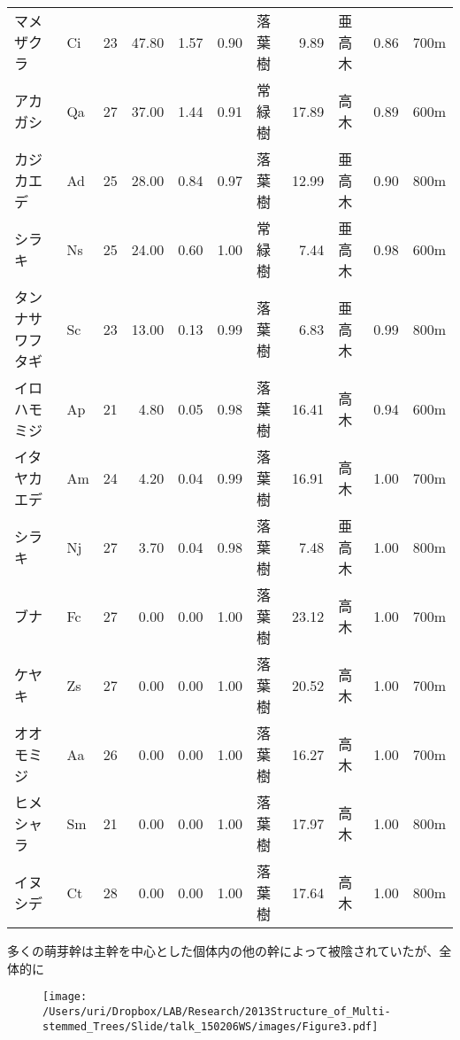 \documentclass[a0, 36pt, plainboxedsections]{sciposter} %
\renewcommand{\baselinestretch}{1.2}
\begin{document}
\begin{multicols}{2}
\begin{table}[ht]
{\begin{tabular}{llrrrrlrlrl}
マメザクラ  &  Ci &  23 & 47.80 & 1.57 & 0.90 & 落葉樹 & 9.89 & 亜高木 & 0.86 & 700m \\ 
アカガシ  &  Qa &  27 & 37.00 & 1.44 & 0.91 & 常緑樹 & 17.89 & 高木 & 0.89 & 600m \\ 
カジカエデ  &  Ad &  25 & 28.00 & 0.84 & 0.97 & 落葉樹 & 12.99 & 亜高木 & 0.90 & 800m \\ 
シラキ  &  Ns &  25 & 24.00 & 0.60 & 1.00 & 常緑樹 & 7.44 & 亜高木 & 0.98 & 600m \\ 
タンナサワフタギ  &  Sc &  23 & 13.00 & 0.13 & 0.99 & 落葉樹 & 6.83 & 亜高木 & 0.99 & 800m \\ 
\rowcolor{Blue2!30}イロハモミジ  &  Ap &  21 & 4.80 & 0.05 & 0.98 & 落葉樹 & 16.41 & 高木 & 0.94 & 600m \\ 
\rowcolor{Blue2!30}イタヤカエデ  &  Am &  24 & 4.20 & 0.04 & 0.99 & 落葉樹 & 16.91 & 高木 & 1.00 & 700m \\ 
\rowcolor{Blue2!30}シラキ  &  Nj &  27 & 3.70 & 0.04 & 0.98 & 落葉樹 & 7.48 & 亜高木 & 1.00 & 800m \\ 
\rowcolor{Blue2!30}ブナ  &  Fc &  27 & 0.00 & 0.00 & 1.00 & 落葉樹 & 23.12 & 高木 & 1.00 & 700m \\ 
\rowcolor{Blue2!30}ケヤキ  &  Zs &  27 & 0.00 & 0.00 & 1.00 & 落葉樹 & 20.52 & 高木 & 1.00 & 700m \\ 
\rowcolor{Blue2!30}オオモミジ  &  Aa &  26 & 0.00 & 0.00 & 1.00 & 落葉樹 & 16.27 & 高木 & 1.00 & 700m \\ 
\rowcolor{Blue2!30}ヒメシャラ  &  Sm &  21 & 0.00 & 0.00 & 1.00 & 落葉樹 & 17.97 & 高木 & 1.00 & 800m \\ 
\rowcolor{Blue2!30}イヌシデ  &  Ct &  28 & 0.00 & 0.00 & 1.00 & 落葉樹 & 17.64 & 高木 & 1.00 & 800m \\ 
  \hline\end{tabular}}
\end{table}

\renewcommand{\baselinestretch}{0.8}
\begin{mdframed}[style=subsection.frame]
  \huge\textbf{}
\end{mdframed}
\renewcommand{\baselinestretch}{1.2}

多くの萌芽幹は主幹を中心とした個体内の他の幹によって被陰されていたが、全体的に

\begin{figure}
	\begin{center}
		\texttt{[image: /Users/uri/Dropbox/LAB/Research/2013Structure\_of\_Multi-stemmed\_Trees/Slide/talk\_150206WS/images/Figure3.pdf]}
		

\end{center}
\end{figure}
\end{multicols}
\end{document}
